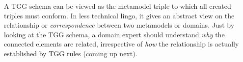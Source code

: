 A TGG schema can be viewed as the metamodel triple to which all created triples must conform.
In less technical lingo, it gives an abstract view on the relationship or \emph{correspondence} between two metamodels or domains.
Just by looking at the TGG schema, a domain expert should understand \emph{why} the connected elements are related, irrespective of \emph{how} the relationship is actually established by TGG rules (coming up next).